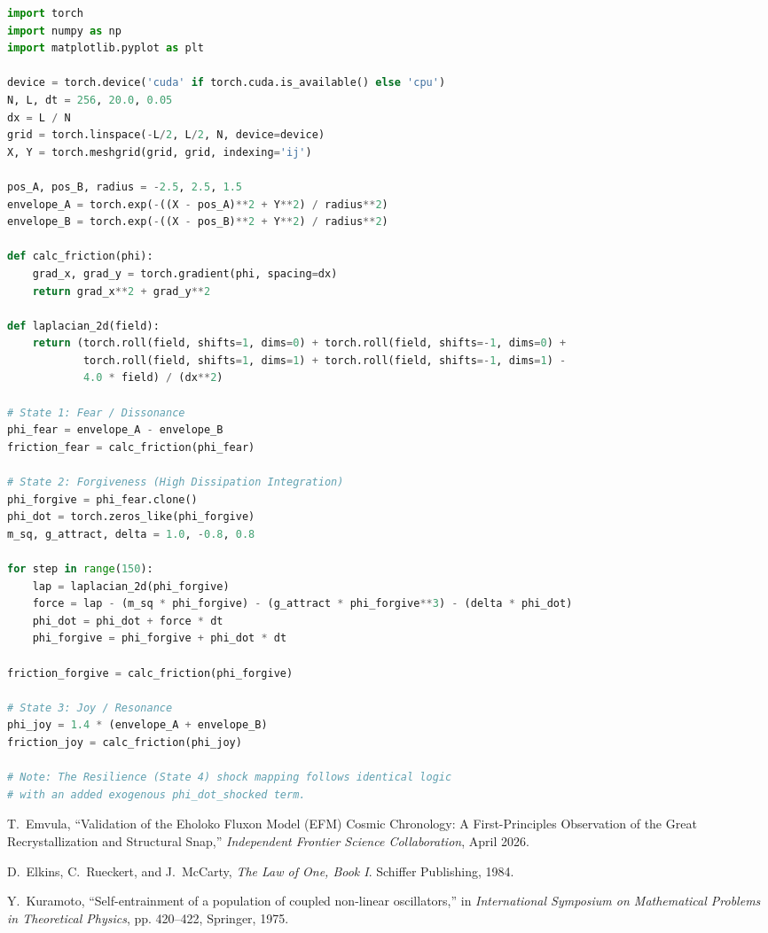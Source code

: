 \documentclass[11pt, twoside]{article}
\begin{document}
\begin{lstlisting}[language=Python, caption=Topological Tensor Mapper (Localized Phase Kinematics)]
import torch
import numpy as np
import matplotlib.pyplot as plt

device = torch.device('cuda' if torch.cuda.is_available() else 'cpu')
N, L, dt = 256, 20.0, 0.05
dx = L / N
grid = torch.linspace(-L/2, L/2, N, device=device)
X, Y = torch.meshgrid(grid, grid, indexing='ij')

pos_A, pos_B, radius = -2.5, 2.5, 1.5
envelope_A = torch.exp(-((X - pos_A)**2 + Y**2) / radius**2)
envelope_B = torch.exp(-((X - pos_B)**2 + Y**2) / radius**2)

def calc_friction(phi):
    grad_x, grad_y = torch.gradient(phi, spacing=dx)
    return grad_x**2 + grad_y**2

def laplacian_2d(field):
    return (torch.roll(field, shifts=1, dims=0) + torch.roll(field, shifts=-1, dims=0) +
            torch.roll(field, shifts=1, dims=1) + torch.roll(field, shifts=-1, dims=1) -
            4.0 * field) / (dx**2)

# State 1: Fear / Dissonance
phi_fear = envelope_A - envelope_B 
friction_fear = calc_friction(phi_fear)

# State 2: Forgiveness (High Dissipation Integration)
phi_forgive = phi_fear.clone()
phi_dot = torch.zeros_like(phi_forgive)
m_sq, g_attract, delta = 1.0, -0.8, 0.8

for step in range(150):
    lap = laplacian_2d(phi_forgive)
    force = lap - (m_sq * phi_forgive) - (g_attract * phi_forgive**3) - (delta * phi_dot)
    phi_dot = phi_dot + force * dt
    phi_forgive = phi_forgive + phi_dot * dt

friction_forgive = calc_friction(phi_forgive)

# State 3: Joy / Resonance
phi_joy = 1.4 * (envelope_A + envelope_B) 
friction_joy = calc_friction(phi_joy)

# Note: The Resilience (State 4) shock mapping follows identical logic 
# with an added exogenous phi_dot_shocked term.
\end{lstlisting}


\begin{thebibliography}{9}
\raggedright
{}
T.~Emvula, ``Validation of the Eholoko Fluxon Model (EFM) Cosmic Chronology: A First-Principles Observation of the Great Recrystallization and Structural Snap,'' \textit{Independent Frontier Science Collaboration}, April 2026.

D.~Elkins, C.~Rueckert, and J.~McCarty, \textit{The Law of One, Book I}. Schiffer Publishing, 1984.

Y.~Kuramoto, ``Self-entrainment of a population of coupled non-linear oscillators,'' in \textit{International Symposium on Mathematical Problems in Theoretical Physics}, pp. 420--422, Springer, 1975.
\end{thebibliography}
\end{document}
